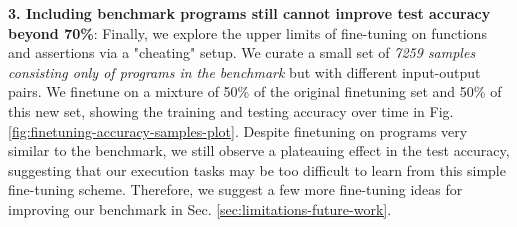 \textbf{3. Including benchmark programs still cannot improve test accuracy beyond 70\%}: Finally, we explore the upper limits of fine-tuning on functions and assertions via a "cheating" setup. We curate a small set of \textit{7259 samples consisting only of programs in the benchmark} but with different input-output pairs. We finetune on a mixture of 50\% of the original finetuning set and 50\% of this new set, showing the training and testing accuracy over time in Fig. \ref{fig:finetuning-accuracy-samples-plot}. Despite finetuning on programs very similar to the benchmark, we still observe a plateauing effect in the test accuracy, suggesting that our execution tasks may be too difficult to learn from this simple fine-tuning scheme. Therefore, we suggest a few more fine-tuning ideas for improving our benchmark in Sec. \ref{sec:limitations-future-work}.


